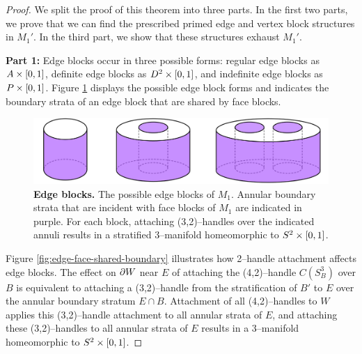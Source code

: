 \begin{proof}
	We split the proof of this theorem into three parts.
	In the first two parts, we prove that we can find the prescribed primed edge and vertex block structures in $M_1'$.
	In the third part, we show that these structures exhaust $M_1'$.
	
	\textbf{Part 1:}
	Edge blocks occur in three possible forms: regular edge blocks as $A\times[0,1]$, definite edge blocks as $D^2\times[0,1]$, and indefinite edge blocks as $P\times[0,1]$.
	Figure \ref{fig:edge-block-incidence} displays the possible edge block forms and indicates the boundary strata of an edge block that are shared by face blocks.
	
	\begin{figure}[h!]
		\centering
		\includegraphics[width=\textwidth]{figures/edge-block-incidence.png}
		\caption{
			\textbf{Edge blocks.}
			The possible edge blocks of $M_1$.
			Annular boundary strata that are incident with face blocks of $M_1$ are indicated in purple.
			For each block, attaching (3,2)--handles over the indicated annuli results in a stratified 3--manifold homeomorphic to $S^2\times[0,1]$.
		}
		\label{fig:edge-block-incidence}
	\end{figure}
	
	Figure \ref{fig:edge-face-shared-boundary} illustrates how 2--handle attachment affects edge blocks.
	The effect on $\partial W$ near $E$ of attaching the (4,2)--handle $C(S_B^3)$ over $B$ is equivalent to attaching a (3,2)--handle from the stratification of $B'$ to $E$ over the annular boundary stratum $E\cap B$.
	Attachment of all (4,2)--handles to $W$ applies this (3,2)--handle attachment to all annular strata of $E$, and attaching these (3,2)--handles to all annular strata of $E$ results in a 3--manifold homeomorphic to $S^2\times[0,1]$.


\end{proof}
